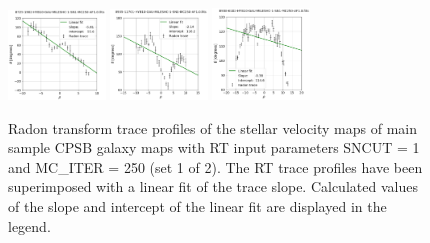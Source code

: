 \documentclass[fleqn,usenatbib]{mnras}
\begin{document}
\begin{figure}
    \includegraphics[width=0.23\textwidth]{Images/LINFITS/CPSB-8725-1902-LINFIT-EBARS-MASKED.png}
    \includegraphics[width=0.23\textwidth]{Images/LINFITS/CPSB-8935-12701-LINFIT-EBARS-MASKED.png}
    \includegraphics[width=0.23\textwidth]{Images/LINFITS/CPSB-8938-6102-LINFIT-EBARS-MASKED.png}
%
    \caption{Radon transform trace profiles of the stellar velocity maps of main sample CPSB galaxy maps with RT input parameters SNCUT = 1 and MC\_ITER = 250 (set 1 of 2). The RT trace profiles have been superimposed with a linear fit of the trace slope. Calculated values of the slope and intercept of the linear fit are displayed in the legend.}
    \label{fig:Radon-traces-CPSB-LINFITS-1}
\end{figure}
\end{document}

